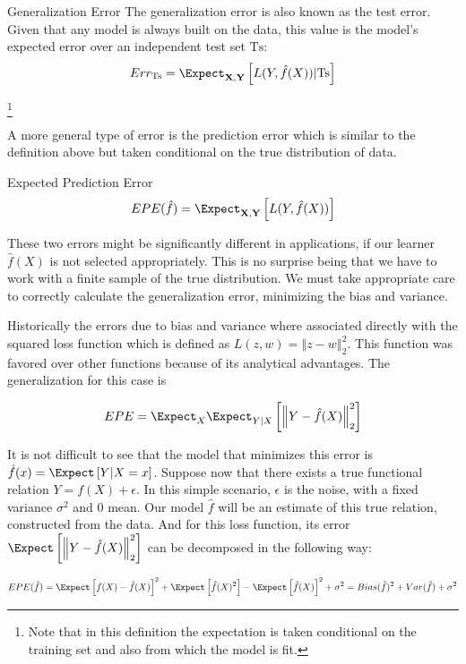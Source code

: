  \begin{definition}{Generalization Error}
 The generalization error is also known as the test error. Given that any model is always built on the data, this value is the model's expected error over an independent test set $\mathrm{Ts}$:
 	$$ Err_{\mathrm{Ts}} = \Expect_{\textbf{X},\textbf{Y}} \left[ L(Y,\hat{f}(X)) |  \mathrm{Ts}\right]$$
 \end{definition}\footnote{Note that in this definition the expectation is taken conditional on the training set and also from which the model is fit.}
 
 A more general type of error is the prediction error which is similar to the definition above but taken conditional on the true distribution of data.
\begin{definition}{Expected Prediction Error}
 $$EPE(\hat{f})= \Expect_{\textbf{X},\textbf{Y}} \left[ L(Y,\hat{f}(X))\right]$$
\end{definition} 

These two errors might be significantly different in applications, if our learner $\hat{f}(X)$ is not selected appropriately. This is no surprise being that we have to work with a finite sample of the true distribution. We must take appropriate care to correctly calculate the generalization error, minimizing the bias and variance.

Historically the errors due to bias and variance where associated directly with the squared loss function which is defined as $L(z,w) = \left\Vert z-w \right\Vert^2_2$. This function was favored over other functions because of its analytical advantages.  The generalization for this case is
 
 \begin{equation}\label{squaredEPE}
 EPE = \Expect_X \Expect_{Y|X} \left[ \left\Vert  Y - \hat{f}(X)  \right\Vert_2^2 \right]
 \end{equation}
 
 It is not difficult to see that the model that minimizes this error is $\hat{f}(x) = \Expect \left[ Y | X=x \right] $. Suppose now that there exists a true functional relation $Y = f(X) + \epsilon$. 
 In this simple scenario, $\epsilon$ is the noise, with a fixed variance $\sigma^2$ and $0$ mean. Our model $\hat{f}$ will be an estimate of this true relation, constructed from the data. And for this loss function, its error $\Expect \left[ \left\Vert Y  - \hat{f}(X) \right\Vert_2^2 \right]$ can be decomposed in the following way:
 
 \begin{equation}\label{squaredBiasDecomposition}
 EPE( \hat{f} ) = \Expect \left[   f(X)  - \hat{f}(X) \right]^2 +  \Expect \left[ \hat{f}(X)^2  \right] - \Expect \left[ \hat{f}(X)  \right]^2  + \sigma^2
 = Bias(\hat{f})^2 + Var(\hat{f}) + \sigma^2
 \end{equation}
 
